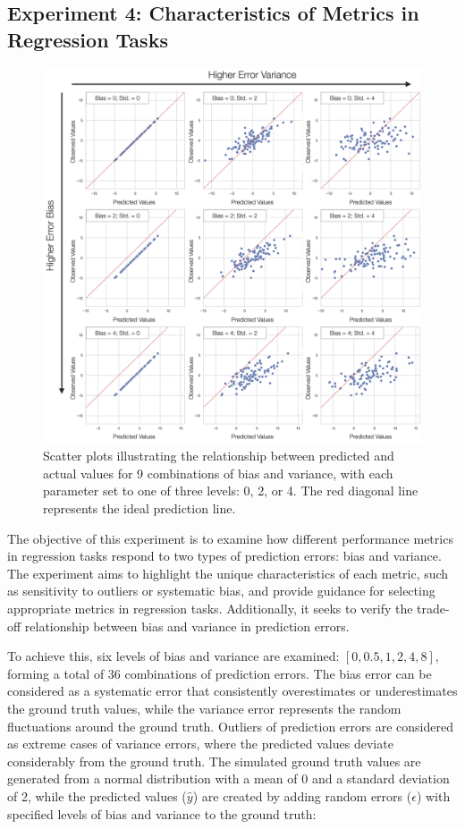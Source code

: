 \subsection{Experiment 4: Characteristics of Metrics in Regression Tasks}

\begin{figure}[H]
    \centering
    \includegraphics[width=1\textwidth]{fig_4.jpg}
    \caption{Scatter plots illustrating the relationship between predicted and actual values for 9 combinations of bias and variance, with each parameter set to one of three levels: 0, 2, or 4. The red diagonal line represents the ideal prediction line.}
    \label{fig:s4_regression}
\end{figure}

The objective of this experiment is to examine how different performance metrics in regression tasks respond to two types of prediction errors: bias and variance. The experiment aims to highlight the unique characteristics of each metric, such as sensitivity to outliers or systematic bias, and provide guidance for selecting appropriate metrics in regression tasks. Additionally, it seeks to verify the trade-off relationship between bias and variance in prediction errors.

To achieve this, six levels of bias and variance are examined: $[0, 0.5, 1, 2, 4, 8]$, forming a total of 36 combinations of prediction errors. The bias error can be considered as a systematic error that consistently overestimates or underestimates the ground truth values, while the variance error represents the random fluctuations around the ground truth. Outliers of prediction errors are considered as extreme cases of variance errors, where the predicted values deviate considerably from the ground truth. The simulated ground truth values are generated from a normal distribution with a mean of 0 and a standard deviation of 2, while the predicted values ($\hat{y}$) are created by adding random errors ($\epsilon$) with specified levels of bias and variance to the ground truth:

